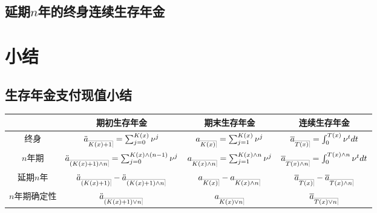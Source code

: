 \documentclass[lang=cn,10pt]{elegantbook}
\makeatletter
\DeclareRobustCommand{\annu}[1]{_{%
    \def\arraystretch{0}%
    \setlength\arraycolsep{1pt}%
    \setlength\arrayrulewidth{.2pt}%
    \begin{array}[b]{@{}c|}\hline
        \\[\arraycolsep]%
        \scriptstyle #1%
    \end{array}%
}}
\makeatother
\begin{document}
\subsection{延期$n$年的终身连续生存年金}


\section{小结}
\subsection{生存年金支付现值小结}
\begin{center}
    \begin{tabular}{c|c|c|c}
        \hline
        & 期初生存年金 & 期末生存年金 & 连续生存年金 \\
        \hline
        终身 & $\ddot a_{\annu{K(x)+1}} = \sum_{j=0}^{K(x)}{\nu^j}$ & $a_{\annu{K(x)}} = \sum_{j=1}^{K(x)}{\nu^j}$ & $\overline{a}_{\annu{T(x)}}=\int_0^{T(x)} \nu^tdt$ \\
        \hline
        $n$年期 & $\ddot a_{\annu{(K(x)+1)\land n}} = \sum_{j=0}^{K(x)\land (n-1)}{\nu^j}$ & $a_{\annu{K(x)\land n}} = \sum_{j=1}^{K(x)\land n}{\nu^j}$ & $  \overline{a}_{\annu{T(x)\land n}}=\int_0^{T(x)\land n} \nu^tdt$ \\
        \hline
        延期$n$年 & $\ddot a_{\annu{(K(x)+1)}} - \ddot a_{\annu{(K(x)+1)\land n}}$ & $a_{\annu{K(x)}} - a_{\annu{K(x)\land n}}$ & $\overline{a}_{\annu{T(x)}} - \overline{a}_{\annu{T(x)\land n}}$  \\
        \hline
        $n$年期确定性 & $\ddot a_{\annu{(K(x)+1)\lor n}}$ & $a_{\annu{K(x)\lor n}}$ & $\overline{a}_{\annu{T(x)\lor n}}$  \\  
        \hline
    \end{tabular}
\end{center}
\end{document}
